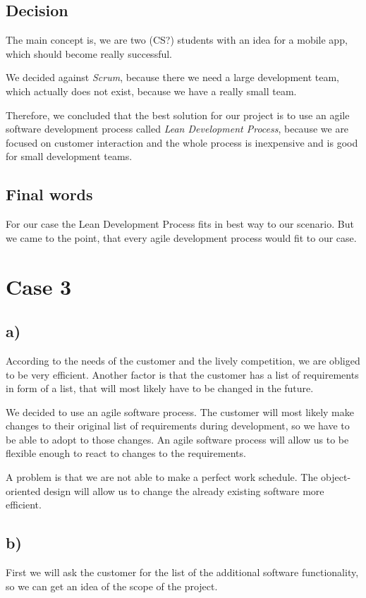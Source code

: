 \documentclass[a4paper, 12pt]{article}
\begin{document}
\subsection{Decision}
The main concept is, we are two (CS?) students with an idea for a mobile app, which should become really successful.

We decided against \emph{Scrum}, because there we need a large development team, which actually does not exist, because we have a really small team.

Therefore, we concluded that the best solution for our project is to use an agile software development process called \emph{Lean Development Process}, because we are focused on customer interaction and the whole process is inexpensive and is good for small development teams.

\subsection{Final words}
For our case the Lean Development Process fits in best way to our scenario. But we came to the point, that every agile development process would fit to our case.

\newpage
\section{Case 3}
\subsection{a)}
According to the needs of the customer and the lively competition, we are obliged to be very efficient. Another factor is that the customer has a list of requirements in form of a list, that will most likely have to be changed in the future.

We decided to use an agile software process. The customer will most likely make changes to their original list of requirements during development, so we have to be able to adopt to those changes. An agile software process will allow us to be flexible enough to react to changes to the requirements.

A problem is that we are not able to make a perfect work schedule. The object-oriented design will allow us to change the already existing software more efficient.

\subsection{b)}
First we will ask the customer for the list of the additional software functionality, so we can get an idea of the scope of the project.
\end{document}

